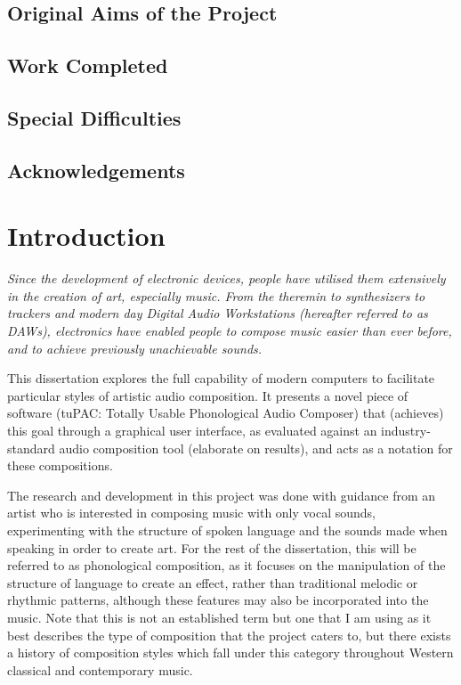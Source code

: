\documentclass[12pt,a4paper,twoside,openright]{report}
\begin{document}
\section*{Original Aims of the Project}




\section*{Work Completed}


\section*{Special Difficulties}


\newpage

\tableofcontents

\listoffigures

\newpage
\section*{Acknowledgements}



\pagestyle{headings}
\chapter{Introduction}
\textit{
Since the development of electronic devices, people have utilised them extensively in the creation of art, especially music. From the theremin to synthesizers to trackers and modern day Digital Audio Workstations (hereafter referred to as DAWs), electronics have enabled people to compose music easier than ever before, and to achieve previously unachievable sounds.
}

This dissertation explores the full capability of modern computers to facilitate particular styles of artistic audio composition. It presents a novel piece of software (tuPAC: Totally Usable Phonological Audio Composer) that (achieves) this goal through a graphical user interface, as evaluated against an industry-standard audio composition tool (elaborate on results), and acts as a notation for these compositions.
 
 The research and development in this project was done with guidance from an artist who is interested in composing music with only vocal sounds, experimenting with the structure of spoken language and the sounds made when speaking in order to create art. For the rest of the dissertation, this will be referred to as phonological composition, as it focuses on the manipulation of the structure of language to create an effect, rather than traditional melodic or rhythmic patterns, although these features may also be incorporated into the music. Note that this is not an established term but one that I am using as it best describes the type of composition that the project caters to, but there exists a history of composition styles which fall under this category throughout Western classical and contemporary music.
\end{document}
